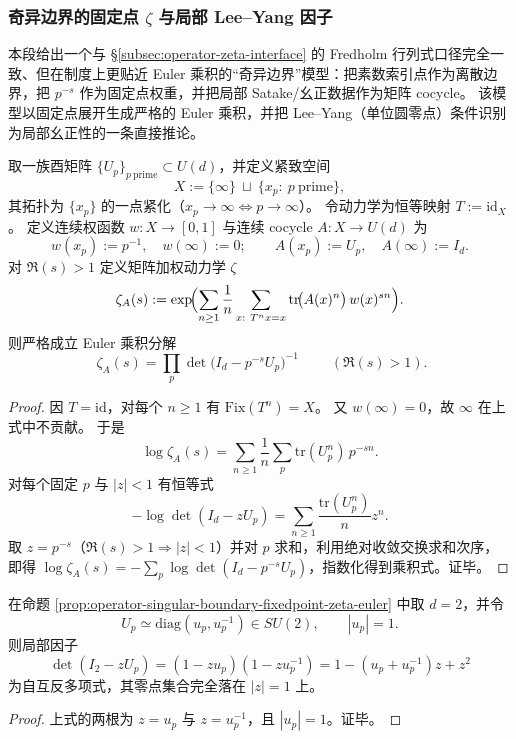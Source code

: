\subsubsection{奇异边界的固定点 \texorpdfstring{$\zeta$}{zeta} 与局部 Lee--Yang 因子}\label{subsubsec:operator-singular-boundary-fixedpoint-euler-leyang}
本段给出一个与 \S\ref{subsec:operator-zeta-interface} 的 Fredholm 行列式口径完全一致、但在制度上更贴近 Euler 乘积的“奇异边界”模型：把素数索引点作为离散边界，把 \(p^{-s}\) 作为固定点权重，并把局部 Satake/幺正数据作为矩阵 cocycle。
该模型以固定点展开生成严格的 Euler 乘积，并把 Lee--Yang（单位圆零点）条件识别为局部幺正性的一条直接推论。

\begin{proposition}\label{prop:operator-singular-boundary-fixedpoint-zeta-euler}
取一族酉矩阵 \(\{U_p\}_{p\ \mathrm{prime}}\subset U(d)\)，并定义紧致空间
\[
X:=\{\infty\}\ \sqcup\ \{x_p:\ p\ \mathrm{prime}\},
\]
其拓扑为 \(\{x_p\}\) 的一点紧化（\(x_p\to\infty\iff p\to\infty\)）。
令动力学为恒等映射 \(T:=\mathrm{id}_X\)。
定义连续权函数 \(w:X\to[0,1]\) 与连续 cocycle \(A:X\to U(d)\) 为
\[
w(x_p):=p^{-1},\quad w(\infty):=0;\qquad
A(x_p):=U_p,\quad A(\infty):=I_d.
\]
对 \(\Re(s)>1\) 定义矩阵加权动力学 \(\zeta\)
\[
\zeta_A(s):=\exp\!\Bigl(\sum_{n\ge 1}\frac{1}{n}\sum_{x:\ T^n x=x}\mathrm{tr}\!\bigl(A(x)^n\bigr)\,w(x)^{sn}\Bigr).
\]
则严格成立 Euler 乘积分解
\[
\boxed{\;
\zeta_A(s)=\prod_{p}\det\bigl(I_d-p^{-s}U_p\bigr)^{-1}\;}
\qquad(\Re(s)>1).
\]
\end{proposition}
\begin{proof}
因 \(T=\mathrm{id}\)，对每个 \(n\ge 1\) 有 \(\mathrm{Fix}(T^n)=X\)。
又 \(w(\infty)=0\)，故 \(\infty\) 在上式中不贡献。
于是
\[
\log\zeta_A(s)
=\sum_{n\ge 1}\frac{1}{n}\sum_{p}\mathrm{tr}(U_p^n)\,p^{-sn}.
\]
对每个固定 \(p\) 与 \(|z|<1\) 有恒等式
\[
-\log\det(I_d-zU_p)=\sum_{n\ge 1}\frac{\mathrm{tr}(U_p^n)}{n}z^n.
\]
取 \(z=p^{-s}\)（\(\Re(s)>1\Rightarrow |z|<1\)）并对 \(p\) 求和，利用绝对收敛交换求和次序，即得
\(
\log\zeta_A(s)=-\sum_p\log\det(I_d-p^{-s}U_p)
\)，指数化得到乘积式。证毕。
\end{proof}

\begin{corollary}\label{cor:operator-local-leyang-selfreciprocal-unitcircle}
在命题 \ref{prop:operator-singular-boundary-fixedpoint-zeta-euler} 中取 \(d=2\)，并令
\[
U_p\simeq \mathrm{diag}(u_p,u_p^{-1})\in SU(2),
\qquad |u_p|=1.
\]
则局部因子
\[
\det(I_2-zU_p)=(1-zu_p)(1-zu_p^{-1})
=1-(u_p+u_p^{-1})z+z^2
\]
为自互反多项式，其零点集合完全落在 \(|z|=1\) 上。
\end{corollary}
\begin{proof}
上式的两根为 \(z=u_p\) 与 \(z=u_p^{-1}\)，且 \(|u_p|=1\)。证毕。
\end{proof}


